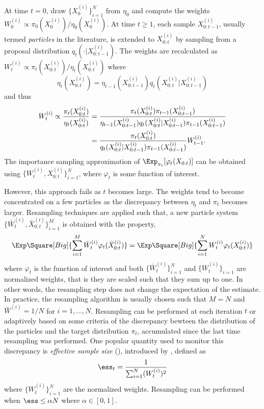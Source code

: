 At time $t = 0$, draw $\{X_0^{(i)}\}_{i=1}^N$ from $\eta_0$ and compute the weights $W_0^{(i)} \propto \pi_0(X_0^{(i)})/\eta_0(X_0^{(i)})$. At time $t\ge1$, each sample $X_{0:t-1}^{(i)}$, usually termed \emph{particles} in the literature, is extended to $X_{0:t}^{(i)}$ by sampling from a proposal distribution $q_t(\cdot|X_{0:t-1}^{(i)})$. The weights are recalculated as $W_t^{(i)} \propto \pi_t(X_{0:t}^{(i)})/\eta_t(X_{0:t}^{(i)})$ where
\begin{equation}
  \eta_t(X_{0:t}^{(i)}) =
  \eta_{t-1}(X_{0:t-1}^{(i)})q_t(X_{0:t}^{(i)}|X_{0:t-1}^{(i)})
\end{equation}
and thus
\begin{align}
  W_t^{(i)} \propto \frac{\pi_t(X_{0:t}^{(i)})}{\eta_t(X_{0:t}^{(i)})}
  &= \frac{\pi_t(X_{0:t}^{(i)})\pi_{t-1}(X_{0:t-1}^{(i)})}
  {\eta_{t-1}(X_{0:t-1}^{(i)})q_t(X_{0:t}^{(i)}|X_{0:t-1}^{(i)})
    \pi_{t-1}(X_{0:t-1}^{(i)})} \notag\\
  &= \frac{\pi_t(X_{0:t}^{(i)})}
  {q_t(X_{0:t}^{(i)}|X_{0:t-1}^{(i)})\pi_{t-1}(X_{0:t-1}^{(i)})}W_{t-1}^{(i)}.
  \label{eq:si}
\end{align}
The importance sampling approximation of $\Exp_{\pi_t}[\varphi_t(X_{0:t})]$ can be obtained using $\{W_t^{(i)},X_{0:t}^{(i)}\}_{i=1}^N$, where $\varphi_t$ is some function of interest.

However, this approach fails as $t$ becomes large. The weights tend to become concentrated on a few particles as the discrepancy between $\eta_t$ and $\pi_t$ becomes larger. Resampling techniques are applied such that, a new particle system $\{\bar{W}_t^{(i)},\bar{X}_{0:t}^{(i)}\}_{i=1}^M$ is obtained with the property,
\begin{equation}
  \Exp\Square[Big]{\sum_{i=1}^M\bar{W}_t^{(i)}\varphi_t(\bar{X}_{0:t}^{(i)})}
  = \Exp\Square[Big]{\sum_{i=1}^NW_t^{(i)}\varphi_t(X_{0:t}^{(i)})}
  \label{eq:resample}
\end{equation}
where $\varphi_t$ is the function of interest and both
$\{\bar{W}_t^{(i)}\}_{i=1}^N$ and $\{W_t^{(i)}\}_{i=1}$ are normalized
weights, that is they are scaled such that they sum up to one. In other words, the resampling step does not change the expectation of the estimate. In practice, the resampling algorithm is usually chosen such that $M = N$ and $\bar{W}^{(i)} = 1/N$ for $i=1,\dots,N$. Resampling can be performed at each iteration $t$ or adaptively based on some criteria of the discrepancy bewteen the distribution of the particles and the target distribution $\pi_t$, accumulated since the last time resampling was performed. One popular quantity used to monitor this discrepancy is \emph{effective sample size} (\ess), introduced by \cite{Liu:1998iu}, defined as
\begin{equation}
  \ess_t = \frac{1}{\sum_{i=1}^N (W_t^{(i)})^2}
\end{equation}
where $\{W_t^{(i)}\}_{i=1}^N$ are the normalized weights. Resampling can be performed when $\ess\le \alpha N$ where $\alpha\in[0,1]$.

